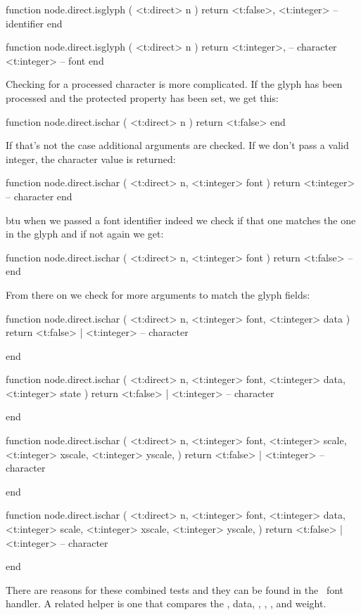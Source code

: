 function node.direct.isglyph ( <t:direct> n )
    return
        <t:false>,
        <t:integer> -- identifier
end

function node.direct.isglyph ( <t:direct> n )
    return
        <t:integer>, -- character
        <t:integer>  -- font
end
\stoptyping

Checking for a processed character is more complicated. If the glyph has been processed and
the protected property has been set, we get this:

\starttyping[option=LUA]
function node.direct.ischar ( <t:direct> n )
    return <t:false>
end
\stoptyping

If that's not the case additional arguments are checked. If we don't pass a valid
integer, the character value is returned:

\starttyping[option=LUA]
function node.direct.ischar ( <t:direct> n, <t:integer> font )
    return <t:integer> -- character
end
\stoptyping

btu when we passed a font identifier indeed we check if that one matches the one in the
glyph and if not again we get:

\starttyping[option=LUA]
function node.direct.ischar ( <t:direct> n, <t:integer> font )
    return <t:false> --
end
\stoptyping

From there on we check for more arguments to match the glyph fields:

\starttyping[option=LUA]
function node.direct.ischar (
    <t:direct>  n,
    <t:integer> font,
    <t:integer> data
)
    return <t:false> | <t:integer> -- character

end

function node.direct.ischar (
    <t:direct>  n,
    <t:integer> font,
    <t:integer> data,
    <t:integer> state
)
    return <t:false> | <t:integer> -- character

end

function node.direct.ischar (
    <t:direct>  n,
    <t:integer> font,
    <t:integer> scale,
    <t:integer> xscale,
    <t:integer> yscale,
)
    return <t:false> | <t:integer> -- character

end

function node.direct.ischar (
    <t:direct>  n,
    <t:integer> font,
    <t:integer> data,
    <t:integer> scale,
    <t:integer> xscale,
    <t:integer> yscale,
)
    return <t:false> | <t:integer> -- character

end
\stoptyping

There are reasons for these combined tests and they can be found in the \CONTEXT\
font handler. A related helper is one that compares the , \type
{data}, \type {scale}, \type {xscale}, \type {yscale}, \type {slant} and \type
{weight}.

